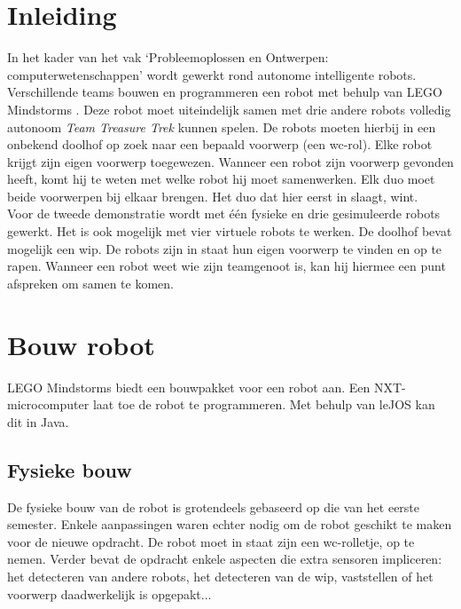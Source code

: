\documentclass[tt2]{penoverslag}
\begin{document}
\newpage


\section{Inleiding} %
\label{ssec:inl}
In het kader van het vak `Probleemoplossen en Ontwerpen: computerwetenschappen' wordt gewerkt rond autonome intelligente robots. Verschillende teams bouwen en programmeren een robot met behulp van LEGO Mindstorms \cite{mindstorms}. Deze robot moet uiteindelijk samen met drie andere robots volledig autonoom \textit{Team Treasure Trek} \cite{TeamTreasure} kunnen spelen.
De robots moeten hierbij in een onbekend doolhof op zoek naar een bepaald voorwerp (een wc-rol). Elke robot krijgt zijn eigen voorwerp toegewezen. Wanneer een robot zijn voorwerp gevonden heeft, komt hij te weten met welke robot hij moet samenwerken. Elk duo moet beide voorwerpen bij elkaar brengen. Het duo dat hier eerst in slaagt, wint.\\

Voor de tweede demonstratie wordt met \'e\'en fysieke en drie gesimuleerde robots gewerkt. Het is ook mogelijk met vier virtuele robots te werken. De doolhof bevat mogelijk een wip. De robots zijn in staat hun eigen voorwerp te vinden en op te rapen. Wanneer een robot weet wie zijn teamgenoot is, kan hij hiermee een punt afspreken om samen te komen.\\


\section{Bouw robot}
\label{ssec:bouwrob}
LEGO Mindstorms \cite{mindstorms} biedt een bouwpakket voor een robot aan. Een NXT-microcomputer laat toe de robot te programmeren. Met behulp van leJOS \cite{leJOS} kan dit in Java.


\subsection{Fysieke bouw}
\label{ssec:fysb}

De fysieke bouw van de robot is grotendeels gebaseerd op die van het eerste semester. Enkele aanpassingen waren echter nodig om de robot geschikt te maken voor de nieuwe opdracht. De robot moet in staat zijn een wc-rolletje, op te nemen. Verder bevat de opdracht enkele aspecten die extra sensoren impliceren: het detecteren van andere robots, het detecteren van de wip, vaststellen of het voorwerp daadwerkelijk is opgepakt...\\
 
\end{document}
